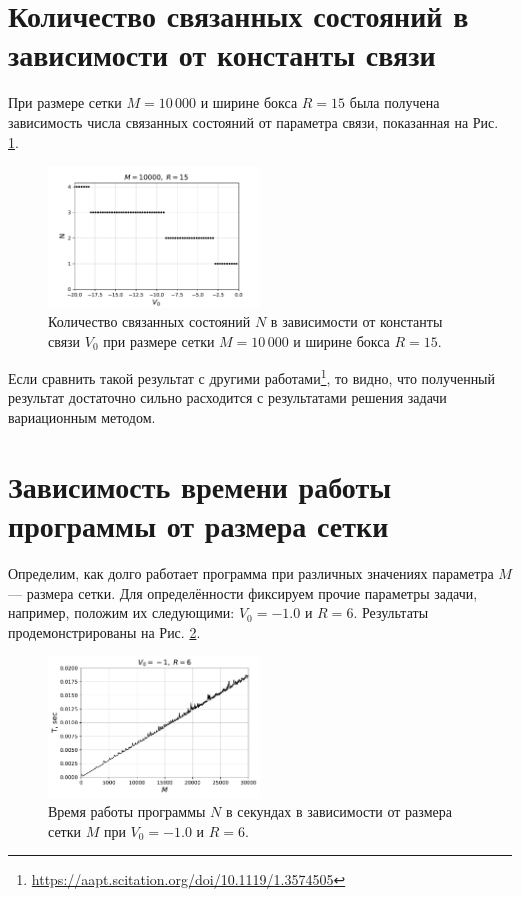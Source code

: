 \documentclass[10pt]{article}
\begin{document}
\section{Количество связанных состояний в зависимости от константы связи}

При размере сетки $M=10\, 000$ и ширине бокса $R=15$ была получена зависимость числа связанных состояний от параметра связи, показанная на Рис. \ref{fig:n_vs_v0}.
\begin{figure}[htbp]
    \centering
    \includegraphics[width=0.5\textwidth]{../figures/num_eigen_vs_v0}
    \caption{Количество связанных состояний $N$ в зависимости от константы связи $V_0$ при размере сетки $M=10\, 000$ и ширине бокса $R=15$.}
    \label{fig:n_vs_v0}
\end{figure} 
Если сравнить такой результат с другими работами\footnote{\url{https://aapt.scitation.org/doi/10.1119/1.3574505}}, то видно, что полученный результат достаточно сильно расходится с результатами решения задачи вариационным методом.

\section{Зависимость времени работы программы от размера сетки}

Определим, как долго работает программа при различных значениях параметра $M$ --- размера сетки. Для определённости фиксируем прочие параметры задачи, например, положим их следующими: $V_0 = -1.0$ и $R=6$. Результаты продемонстрированы на Рис. \ref{fig:T_vs_M}.
\begin{figure}[htbp]
    \centering
    \includegraphics[width=0.5\textwidth]{../figures/T_vs_M}
    \caption{Время работы программы $N$ в секундах в зависимости от размера сетки $M$ при $V_0 = -1.0$ и $R=6$.}
    \label{fig:T_vs_M}
\end{figure} 
\end{document}

